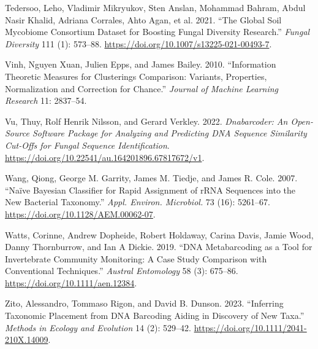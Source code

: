 \documentclass[
]{article}
\newlength{\cslhangindent}
\newenvironment{CSLReferences}[2] %
 {\begin{list}{}{%
  \setlength{\itemindent}{0pt}
  \setlength{\leftmargin}{0pt}
  \setlength{\parsep}{0pt}
  \ifodd #1
   \setlength{\leftmargin}{\cslhangindent}
   \setlength{\itemindent}{-1\cslhangindent}
  \fi
  \setlength{\itemsep}{#2\baselineskip}}}
 {\end{list}}
\begin{document}
\begin{CSLReferences}{1}{0}
Tedersoo, Leho, Vladimir Mikryukov, Sten Anslan, Mohammad Bahram, Abdul Nasir Khalid, Adriana Corrales, Ahto Agan, et al. 2021. {``The {Global Soil Mycobiome} Consortium Dataset for Boosting Fungal Diversity Research.''} \emph{Fungal Diversity} 111 (1): 573--88. \url{https://doi.org/10.1007/s13225-021-00493-7}.

Vinh, Nguyen Xuan, Julien Epps, and James Bailey. 2010. {``Information {Theoretic Measures} for {Clusterings Comparison}: {Variants}, {Properties}, {Normalization} and {Correction} for {Chance}.''} \emph{Journal of Machine Learning Research} 11: 2837--54.

Vu, Thuy, Rolf Henrik Nilsson, and Gerard Verkley. 2022. \emph{Dnabarcoder: An Open-Source Software Package for Analyzing and Predicting {DNA} Sequence Similarity Cut-Offs for Fungal Sequence Identification}. \url{https://doi.org/10.22541/au.164201896.67817672/v1}.

Wang, Qiong, George M. Garrity, James M. Tiedje, and James R. Cole. 2007. {``Naïve {Bayesian Classifier} for {Rapid Assignment} of {rRNA Sequences} into the {New Bacterial Taxonomy}.''} \emph{Appl. Environ. Microbiol.} 73 (16): 5261--67. \url{https://doi.org/10.1128/AEM.00062-07}.

Watts, Corinne, Andrew Dopheide, Robert Holdaway, Carina Davis, Jamie Wood, Danny Thornburrow, and Ian A Dickie. 2019. {``{DNA} Metabarcoding as a Tool for Invertebrate Community Monitoring: A Case Study Comparison with Conventional Techniques.''} \emph{Austral Entomology} 58 (3): 675--86. \url{https://doi.org/10.1111/aen.12384}.

Zito, Alessandro, Tommaso Rigon, and David B. Dunson. 2023. {``Inferring Taxonomic Placement from {DNA} Barcoding Aiding in Discovery of New Taxa.''} \emph{Methods in Ecology and Evolution} 14 (2): 529--42. \url{https://doi.org/10.1111/2041-210X.14009}.

\end{CSLReferences}
\end{document}
